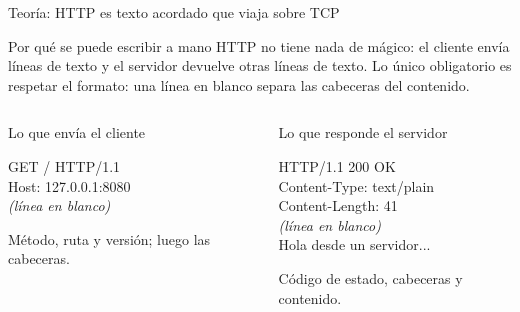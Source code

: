 \documentclass[aspectratio=169,10pt,c]{beamer}
\begin{document}
\begin{frame}{Teoría: HTTP es texto acordado que viaja sobre TCP}
\begin{block}{Por qué se puede escribir a mano}
\small HTTP no tiene nada de mágico: el cliente envía líneas de texto y el servidor devuelve otras líneas de texto. Lo único obligatorio es respetar el formato: una línea en blanco separa las cabeceras del contenido.
\end{block}
\begin{columns}[T,onlytextwidth]
\begin{exampleblock}{Lo que envía el cliente}
\begin{terminal}\footnotesize
GET / HTTP/1.1\\
Host: 127.0.0.1:8080\\
\textit{(línea en blanco)}
\end{terminal}
\small Método, ruta y versión; luego las cabeceras.
\end{exampleblock}
\begin{exampleblock}{Lo que responde el servidor}
\begin{terminal}\footnotesize
HTTP/1.1 200 OK\\
Content-Type: text/plain\\
Content-Length: 41\\
\textit{(línea en blanco)}\\
Hola desde un servidor...
\end{terminal}
\small Código de estado, cabeceras y contenido.
\end{exampleblock}
\end{columns}
\end{frame}
\end{document}
